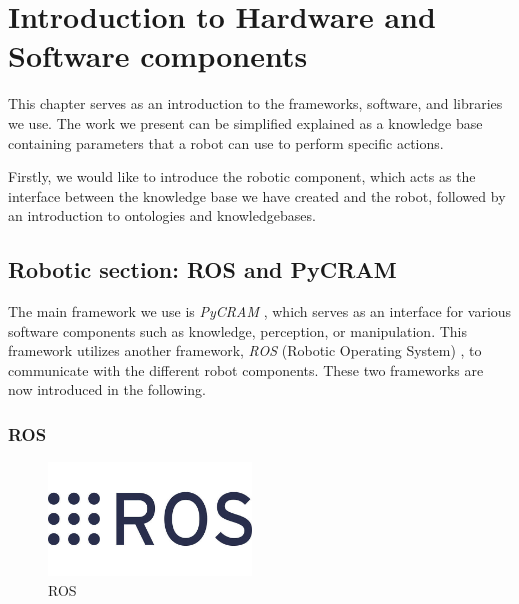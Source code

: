     \chapter{Introduction to Hardware and Software components}
    This chapter serves as an introduction to the frameworks, software, and libraries we use. The work we present can be simplified explained as a knowledge base containing parameters that a robot can use to perform specific actions.

    Firstly, we would like to introduce the robotic component, which acts as the interface between the knowledge base we have created and the robot, followed by an introduction to ontologies and knowledgebases.
    \section{Robotic section: ROS and PyCRAM}
    
    The main framework we use is \textit{PyCRAM} \cite{pycram}, which serves as an interface for various software components such as knowledge, perception, or manipulation. 
	This framework utilizes another framework, \textit{ROS} (Robotic Operating System) \cite{ros}, to communicate with the different robot components. These two frameworks are now introduced in the following.    
    \subsection{ROS}
	\label{sec:ROS}
    \begin{figure}
        \centering
        \includegraphics[width=0.48\textwidth]{Graphics/ROS.jpg}
		\caption{ROS \cite{ros}}
    \end{figure}

